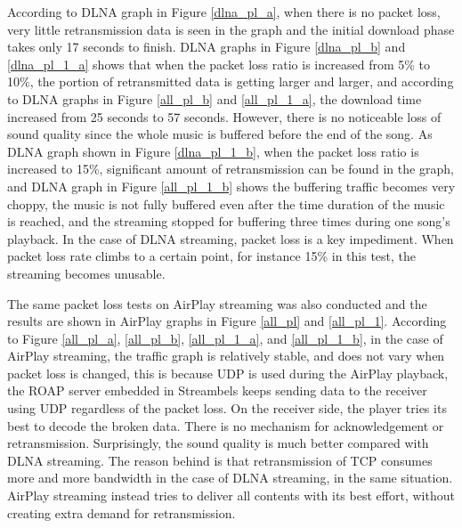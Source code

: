 According to DLNA graph in Figure \ref{dlna_pl_a}, when there is no packet
loss, very little retransmission data is seen in the graph and the initial
download phase takes only 17 seconds to finish. DLNA graphs in Figure
\ref{dlna_pl_b} and \ref{dlna_pl_1_a} shows that when the packet loss ratio is
increased from 5\% to 10\%, the portion of retransmitted data is getting larger
and larger, and according to DLNA graphs in Figure \ref{all_pl_b} and
\ref{all_pl_1_a}, the download time increased from 25 seconds to 57 seconds.
However, there is no noticeable loss of sound quality since the whole music is
buffered before the end of the song. As DLNA graph shown in Figure
\ref{dlna_pl_1_b}, when the packet loss ratio is increased to 15\%, significant
amount of retransmission can be found in the graph, and DLNA graph in Figure
\ref{all_pl_1_b} shows the buffering traffic becomes very choppy, the music
is not fully buffered even after the time duration of the music is reached, and
the streaming stopped for buffering three times during one song's playback. In the
case of DLNA streaming, packet loss is a key impediment. When packet loss rate
climbs to a certain point, for instance 15\% in this test, the streaming
becomes unusable.

The same packet loss tests on AirPlay streaming was also conducted and the
results are shown in AirPlay graphs in Figure \ref{all_pl} and \ref{all_pl_1}.
According to Figure \ref{all_pl_a}, \ref{all_pl_b}, \ref{all_pl_1_a}, and
\ref{all_pl_1_b}, in the case of AirPlay streaming, the traffic graph is
relatively stable, and does not vary when packet loss is changed, this is
because UDP is used during the AirPlay playback, the ROAP server embedded in
Streambels keeps sending data to the receiver using UDP regardless of the
packet loss. On the receiver side, the player tries its best to decode the
broken data. There is no mechanism for acknowledgement or retransmission.
Surprisingly, the sound quality is much better compared with DLNA streaming.
The reason behind is that retransmission of TCP consumes more and more
bandwidth in the case of DLNA streaming, in the same situation.
AirPlay streaming instead tries to deliver all contents with its best effort,
without creating extra demand for retransmission.

